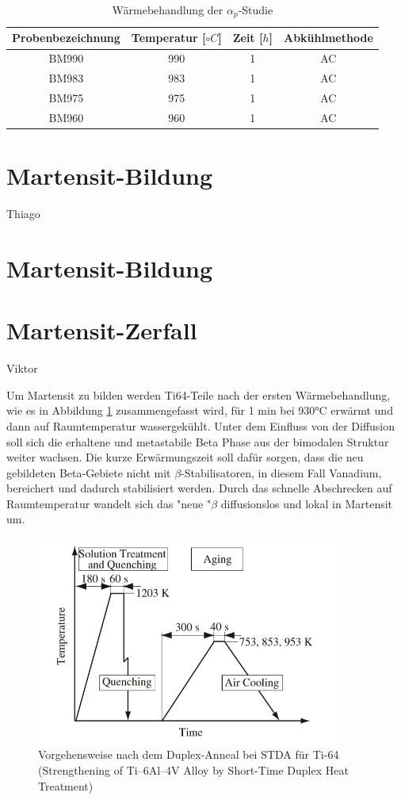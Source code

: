 \begin{table}
		\centering
	\begin{tabular}{|c|c|c|c|}
	\hline 
	Probenbezeichnung & Temperatur [$\circ C$] & Zeit [$h$] & Abkühlmethode \\ 
	\hline 
	BM990 & 990 & 1 & AC\\ 
	\hline 
	BM983 & 983 & 1 & AC\\ 
	\hline 
	BM975 & 975 & 1 & AC\\ 
	\hline 
	BM960 & 960 & 1 & AC\\ 
	\hline 
	\end{tabular} 
	\caption{Wärmebehandlung der $\alpha_p$-Studie}
	\label{tab:alphap}
\end{table}



\section{Martensit-Bildung}{Thiago}



\section{Martensit-Bildung}

\section{Martensit-Zerfall}{Viktor}

Um Martensit zu bilden werden Ti64-Teile  nach der ersten Wärmebehandlung, wie es in Abbildung \ref{STDA} zusammengefasst wird, für 1 min  bei 930°C erwärmt und dann  auf Raumtemperatur wassergekühlt. Unter dem Einfluss von der Diffusion soll sich die erhaltene und metastabile Beta Phase aus der bimodalen Struktur weiter wachsen. Die kurze Erwärmungszeit soll dafür sorgen, dass die neu gebildeten Beta-Gebiete nicht mit $\beta$-Stabilisatoren, in diesem Fall Vanadium, bereichert  und dadurch stabilisiert werden. Durch das schnelle Abschrecken auf Raumtemperatur wandelt sich das "neue "$\beta$ diffusionslos und lokal in Martensit um. 

\begin{figure}[H]
	\centering
	\includegraphics[width=0.9\textwidth]{Bilder/ts-stda}
	\caption{Vorgehensweise nach dem Duplex-Anneal bei STDA für Ti-64 (Strengthening of Ti–6Al–4V Alloy by Short-Time Duplex Heat Treatment)}
	\label{STDA}
\end{figure}


